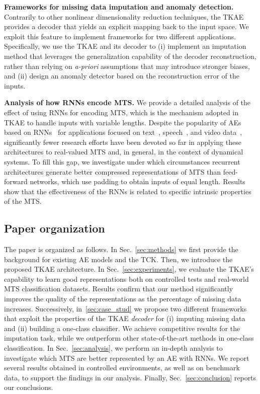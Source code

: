 \documentclass[a4paper,10pt,pdftex]{article}
\begin{document}
\textbf{Frameworks for missing data imputation and anomaly detection.}
Contrarily to other nonlinear dimensionality reduction techniques, the TKAE provides a decoder that yields an explicit mapping back to the input space. 
We exploit this feature to implement frameworks for two different applications.
Specifically, we use the TKAE and its decoder to (i) implement an imputation method that leverages the generalization capability of the decoder reconstruction, rather than relying on \textit{a-priori} assumptions that may introduce stronger biases, and (ii) design an anomaly detector based on the reconstruction error of the inputs.
\newline

\textbf{Analysis of how RNNs encode MTS.}
We provide a detailed analysis of the effect of using RNNs for encoding MTS, which is the mechanism adopted in TKAE to handle inputs with variable lengths.
Despite the popularity of AEs based on RNNs~\cite{sutskever2014sequence} for applications focused on text~\cite{DBLP:journals/corr/BowmanVVDJB15}, speech~\cite{SU2017397}, and video data~\cite{srivastava2015unsupervised}, significantly fewer research efforts have been devoted so far in applying these architectures to real-valued MTS and, in general, in the context of dynamical systems.
To fill this gap, we investigate under which circumstances recurrent architectures generate better compressed representations of MTS than feed-forward networks, which use padding to obtain inputs of equal length.
Results show that the effectiveness of the RNNs is related to specific intrinsic properties of the MTS.


\subsection{Paper organization}
The paper is organized as follows.
In Sec.~\ref{sec:methods} we first provide the background for existing AE models and the TCK. 
Then, we introduce the proposed TKAE architecture.
In Sec.~\ref{sec:experiments}, we evaluate the TKAE's capability to learn good representations both on controlled tests and real-world MTS classification datasets.
Results confirm that our method significantly improves the quality of the representations as the percentage of missing data increases.
Successively, in~\ref{sec:case_stud} we propose two different frameworks that exploit the properties of the TKAE \emph{decoder} for (i) imputing missing data and (ii) building a one-class classifier.
We achieve competitive results for the imputation task, while we outperform other state-of-the-art methods in one-class classification.
In Sec.~\ref{sec:analysis}, we perform an in-depth analysis to investigate which MTS are better represented by an AE with RNNs.
We report several results obtained in controlled environments, as well as on benchmark data, to support the findings in our analysis.
Finally, Sec.~\ref{sec:conclusion} reports our conclusions.
\end{document}
